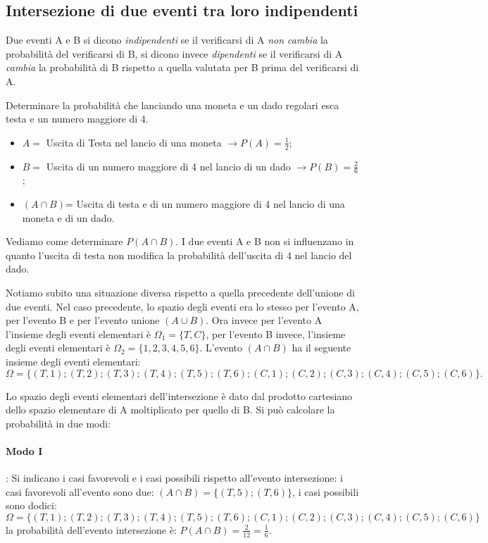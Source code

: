 \subsection{Intersezione di due eventi tra loro indipendenti}
Due eventi A e B si dicono \emph{indipendenti} se il verificarsi di A \emph{non cambia} la probabilità del verificarsi di B, si dicono invece \emph{dipendenti} se il verificarsi di A \emph{cambia} la probabilità di B rispetto a quella valutata per B prima del verificarsi di A.
\newpage
\begin{exrig}
\begin{esempio}
Determinare la probabilità che lanciando una moneta e un dado regolari esca testa e un numero maggiore di 4.
\begin{itemize}
\item $ A = $ Uscita di Testa nel lancio di una moneta $\to P(A)=\frac 1 2$;
\item $ B = $ Uscita di un numero maggiore di 4 nel lancio di un dado $\to P(B)=\frac 2 6$;
\item $(A\cap B)$= Uscita di testa e di un numero maggiore di 4 nel lancio di una moneta e di un dado.
\end{itemize}
Vediamo come determinare $P(A\cap B)$.
I due eventi A e B non si influenzano in quanto l'uscita di testa non modifica la probabilità dell'uscita di 4 nel lancio del dado.

Notiamo subito una situazione diversa rispetto a quella precedente dell'unione di due eventi. Nel caso precedente, lo spazio degli eventi era lo stesso per l'evento A, per l'evento B e per l'evento unione $(A\cup B)$.
Ora invece per l'evento A l'insieme degli eventi elementari è $\Omega _1=\{T,C\}$, per l'evento B invece, l'insieme degli eventi elementari è $\Omega _2=\{1,2,3,4,5,6\}$. L'evento $(A\cap B)$ ha il seguente insieme degli eventi elementari: \[ \Omega =\{(T,1);(T,2);(T,3);(T,4);(T,5);(T,6);(C,1);(C,2);(C,3);(C,4);(C,5);(C,6)\}. \]

Lo spazio degli eventi elementari dell'intersezione è dato dal prodotto cartesiano dello spazio elementare di A moltiplicato per quello di B. Si può calcolare la probabilità in due modi:
\paragraph{Modo I}: Si indicano i casi favorevoli e i casi possibili rispetto all'evento intersezione: i casi favorevoli all'evento sono due: $(A\cap B)=\{(T,5);(T,6)\}$, i casi possibili sono dodici: \[\Omega =\{(T,1);(T,2);(T,3);(T,4);(T,5);(T,6);(C,1);(C,2);(C,3);(C,4);(C,5);(C,6)\} \] la probabilità dell'evento intersezione è: $P(A\cap B)=\frac 2{12}=\frac 1 6$.


\end{esempio}
\end{exrig}
